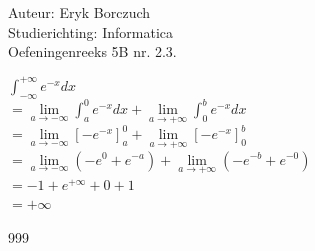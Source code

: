 \documentclass[a4paper]{article}
\begin{document}
  
\noindent \large Auteur: Eryk Borczuch \\
\noindent \large Studierichting: Informatica\\
\noindent \large Oefeningenreeks 5B nr. 2.3.\\

\medskip

\normalsize

$\displaystyle\int_{-\infty}^{+\infty} e^{-x} dx $\\

$= \lim\limits_{a \to -\infty } \displaystyle\int_{a}^{0}e^{-x}dx + \lim\limits_{a \to +\infty } \displaystyle\int_{0}^{b} e^{-x}dx $\\

$= \lim\limits_{a \to -\infty} [-e^{-x}]_a^0 + \lim\limits_{a \to +\infty} [-e^{-x}]_0^b $\\

$= \lim\limits_{a \to -\infty} (-e^0 + e^{-a} ) + \lim\limits_{a \to +\infty} (-e^{-b} + e^{-0})  $\\

$= -1 + e^{+\infty} + 0 + 1 $\\

$= +\infty$\\


\begin{thebibliography}{999}
\end{thebibliography}
\end{document}
